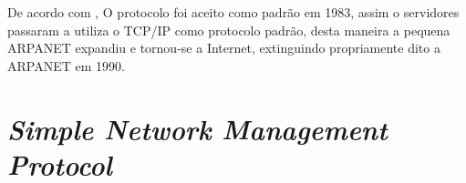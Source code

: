 
De acordo com , O protocolo foi aceito como
padrão em 1983, assim o servidores passaram a utiliza o TCP/IP como protocolo
padrão, desta maneira a pequena ARPANET expandiu e tornou-se a Internet,
extinguindo propriamente dito a ARPANET em 1990.




















\section{\textit{Simple Network Management Protocol}  }

